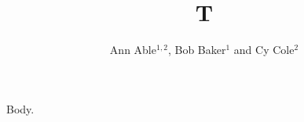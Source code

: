 \documentclass{svproc}
\begin{document}
\title{T}
\author{Ann Able${}^{1,2}$, Bob Baker${}^{1}$ and Cy Cole${}^{2}$}
\maketitle
Body.
\end{document}
